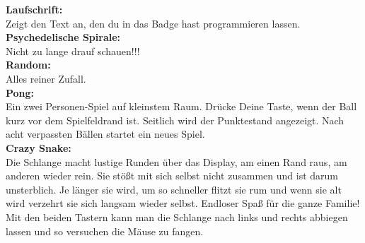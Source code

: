 \documentclass{article}
\begin{document}
\textbf{Laufschrift:}\\
Zeigt den Text an, den du in das Badge hast programmieren lassen.\\

\textbf{Psychedelische Spirale:}\\
Nicht zu lange drauf schauen!!!\\

\textbf{Random:}\\
Alles reiner Zufall.\\

\textbf{Pong:}\\
Ein zwei Personen-Spiel auf kleinstem Raum. Drücke Deine Taste, wenn der Ball kurz vor dem Spielfeldrand ist. Seitlich wird der Punktestand angezeigt. Nach acht verpassten Bällen startet ein neues Spiel.\\

\textbf{Crazy Snake:}\\
Die Schlange macht lustige Runden über das Display, am einen Rand raus, am anderen wieder rein. Sie stößt mit sich selbst nicht zusammen und ist darum unsterblich. Je länger sie wird, um so schneller flitzt sie rum und wenn sie alt wird verzehrt sie sich langsam wieder selbst. Endloser Spaß für die ganze Familie!\\

Mit den beiden Tastern kann man die Schlange nach links und rechts abbiegen lassen und so versuchen die Mäuse zu fangen.



\end{document}
